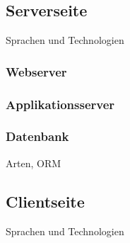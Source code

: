 \subsection{Serverseite}
Sprachen und Technologien

\subsubsection{Webserver}

\subsubsection{Applikationsserver}

\subsubsection{Datenbank}
Arten, ORM

\subsection{Clientseite}
Sprachen und Technologien

